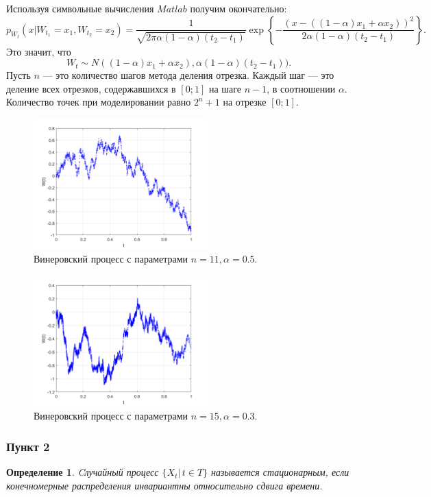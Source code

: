 \documentclass[oneside, final, 12pt]{article}
\newtheorem{definition}{Определение}
\begin{document}
	Используя символьные вычисления $Matlab$ получим окончательно:
	$$
		p_{W_t}(x|W_{t_1} = x_1, W_{t_2} = x_2) = \dfrac{1}{\sqrt{2\pi\alpha(1-\alpha)(t_2 - t_1)}}
													\exp \left\{-\dfrac{(x - ((1-\alpha)x_1 +\alpha x_2) )^2}
																				{2\alpha(1-\alpha)(t_2 - t_1)}\right\}.
	$$
	Это значит, что $$W_t \sim N((1-\alpha)x_1 +\alpha x_2), \alpha(1-\alpha)(t_2 - t_1) ).$$
	\newline Пусть $n$ --- это количество шагов метода деления отрезка. Каждый шаг ---  это деление 
	всех отрезков, содержавшихся в $[0;1]$ на шаге $n-1$, в соотношении $\alpha$. Количество точек 
	при моделировании равно $2^{n}+1$ на отрезке $[0;1]$.
	
	\begin{figure}[h!]
		\centering
		\includegraphics[width=0.6\textwidth]{../code/Task_9/pict/w_11_5_ex.png}
		\caption{Винеровский процесс с параметрами $n = 11, \alpha = 0.5$. }
    \end{figure}
    \begin{figure}[h!]
		\centering
		\includegraphics[width=0.6\textwidth]{../code/Task_9/pict/w_15_3_ex.png}
		\caption{Винеровский процесс с параметрами $n = 15, \alpha = 0.3$.}
    \end{figure}
	
\newpage	
\subsubsection{Пункт 2}
	\begin{definition}
		Cлучайный процесс $\{X_t |\, t\in T\}$ называется стационарным, если конечномерные
		распределения инвариантны относительно сдвига времени.
	\end{definition}
	
\end{document}
